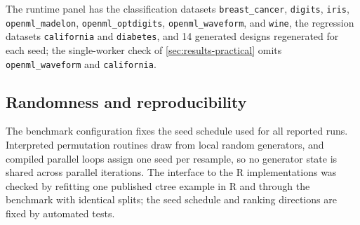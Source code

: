 The runtime panel has the classification datasets \nolinkurl{breast_cancer},
\nolinkurl{digits}, \nolinkurl{iris}, \nolinkurl{openml_madelon},
\nolinkurl{openml_optdigits}, \nolinkurl{openml_waveform}, and \nolinkurl{wine},
the regression datasets \nolinkurl{california} and \nolinkurl{diabetes}, and 14
generated designs regenerated for each seed; the single-worker check of
\cref{sec:results-practical} omits \nolinkurl{openml_waveform} and
\nolinkurl{california}.

\subsection{Randomness and reproducibility}

The benchmark configuration fixes the seed schedule used for all reported
runs. Interpreted permutation routines draw from local random generators, and
compiled parallel loops assign one seed per resample, so no generator state is
shared across parallel iterations. The interface to the R implementations
was checked by refitting one published ctree example in R and through the
benchmark with identical splits; the seed schedule and ranking directions are fixed by automated tests.
